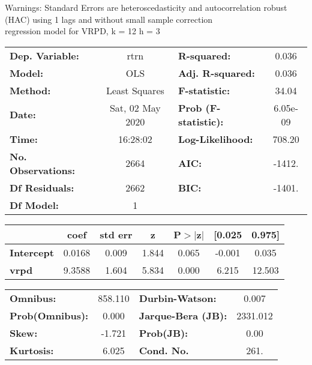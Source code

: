 Warnings: \newline
 [1] Standard Errors are heteroscedasticity and autocorrelation robust (HAC) using 1 lags and without small sample correction\\ 

regression model for VRPD, k = 12 h = 3\begin{center}
\begin{tabular}{lclc}
\toprule
\textbf{Dep. Variable:}    &       rtrn       & \textbf{  R-squared:         } &     0.036   \\
\textbf{Model:}            &       OLS        & \textbf{  Adj. R-squared:    } &     0.036   \\
\textbf{Method:}           &  Least Squares   & \textbf{  F-statistic:       } &     34.04   \\
\textbf{Date:}             & Sat, 02 May 2020 & \textbf{  Prob (F-statistic):} &  6.05e-09   \\
\textbf{Time:}             &     16:28:02     & \textbf{  Log-Likelihood:    } &    708.20   \\
\textbf{No. Observations:} &        2664      & \textbf{  AIC:               } &    -1412.   \\
\textbf{Df Residuals:}     &        2662      & \textbf{  BIC:               } &    -1401.   \\
\textbf{Df Model:}         &           1      & \textbf{                     } &             \\
\bottomrule
\end{tabular}
\begin{tabular}{lcccccc}
                   & \textbf{coef} & \textbf{std err} & \textbf{z} & \textbf{P$> |$z$|$} & \textbf{[0.025} & \textbf{0.975]}  \\
\midrule
\textbf{Intercept} &       0.0168  &        0.009     &     1.844  &         0.065        &       -0.001    &        0.035     \\
\textbf{vrpd}      &       9.3588  &        1.604     &     5.834  &         0.000        &        6.215    &       12.503     \\
\bottomrule
\end{tabular}
\begin{tabular}{lclc}
\textbf{Omnibus:}       & 858.110 & \textbf{  Durbin-Watson:     } &    0.007  \\
\textbf{Prob(Omnibus):} &   0.000 & \textbf{  Jarque-Bera (JB):  } & 2331.012  \\
\textbf{Skew:}          &  -1.721 & \textbf{  Prob(JB):          } &     0.00  \\
\textbf{Kurtosis:}      &   6.025 & \textbf{  Cond. No.          } &     261.  \\
\bottomrule
\end{tabular}
\end{center}

